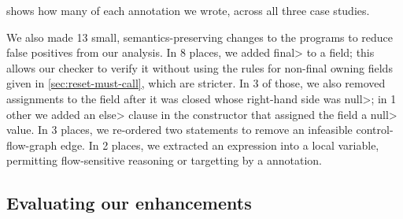  shows how many of each annotation we wrote, across all three
case studies.  

We also
made 13 small, semantics-preserving changes to the programs to reduce
false positives from our analysis.
%
In 8 places, we added \<final> to a field; this allows our checker to verify it without using
the rules for non-final owning fields given in \cref{sec:reset-must-call}, which are stricter.
In 3 of those, we also removed assignments to the field after it was closed whose right-hand
side was \<null>; in 1 other we added an \<else> clause in the constructor that assigned the field
a \<null> value.
%
In 3 places, we re-ordered two statements to remove an
infeasible control-flow-graph edge.
%
In 2 places, we extracted an expression into a local variable, permitting
flow-sensitive reasoning or targetting by a \CreateObligation annotation.


\subsection{Evaluating our enhancements}
\label{sec:ablation}

\newcommand{\abltablerow}[4]{\textbf{\smaller{#1}} & #2 & #3 & #4}

